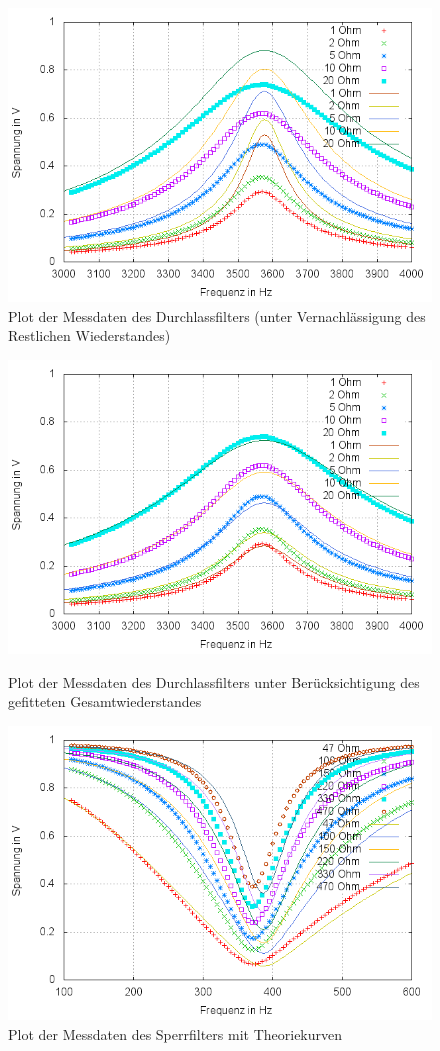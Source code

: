 \begin{figure}
        \includegraphics[width=.9\textwidth]{images/plot/durchlassfilter+theorie+R_ges.png}
\caption{Plot der Messdaten des Durchlassfilters (unter Vernachlässigung des Restlichen Wiederstandes)}
\label{plot:durchlass+R_ges}
\end{figure}
\begin{figure}
	\includegraphics[width=.9\textwidth]{images/plot/durchlassfilter+theorie+R_ges-fit.png}
\caption{Plot der Messdaten des Durchlassfilters unter Berücksichtigung des gefitteten Gesamtwiederstandes}
\label{plot:durchlass+R_ges-fit}

        \includegraphics[width=.9\textwidth]{images/plot/sperrfilter+theorie+R_L.png}
\caption{Plot der Messdaten des Sperrfilters mit Theoriekurven}
\label{plot:sperr}
\end{figure}

